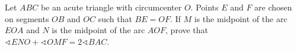 Let $ABC$ be an acute triangle with circumcenter $O$. Points $E$ and $F$ are chosen on segments $OB$ and $OC$ such that $BE = OF$. If $M$ is the midpoint of the arc $EOA$ and $N$ is the midpoint of the arc $AOF$,  prove that $\sphericalangle ENO + \sphericalangle OMF = 2 \sphericalangle BAC$.